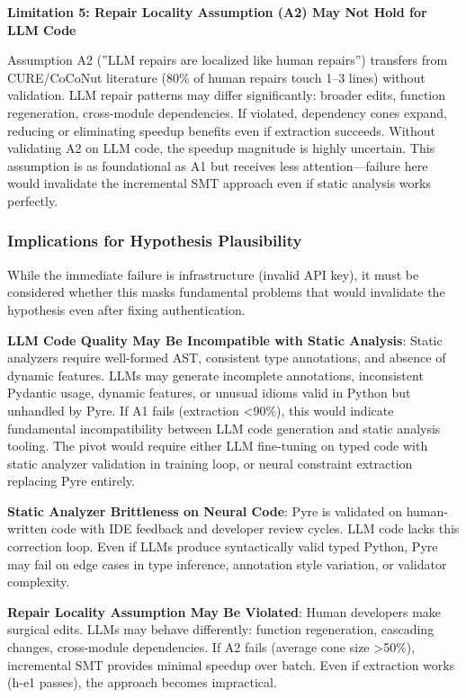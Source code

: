 \textbf{Limitation 5: Repair Locality Assumption (A2) May Not Hold for LLM Code}

Assumption A2 (''LLM repairs are localized like human repairs'') transfers from CURE/CoCoNut literature (80\% of human repairs touch 1--3 lines) without validation. LLM repair patterns may differ significantly: broader edits, function regeneration, cross-module dependencies. If violated, dependency cones expand, reducing or eliminating speedup benefits even if extraction succeeds. Without validating A2 on LLM code, the speedup magnitude is highly uncertain. This assumption is as foundational as A1 but receives less attention---failure here would invalidate the incremental SMT approach even if static analysis works perfectly.

\subsubsection{Implications for Hypothesis Plausibility}

While the immediate failure is infrastructure (invalid API key), it must be considered whether this masks fundamental problems that would invalidate the hypothesis even after fixing authentication.

\textbf{LLM Code Quality May Be Incompatible with Static Analysis}: Static analyzers require well-formed AST, consistent type annotations, and absence of dynamic features. LLMs may generate incomplete annotations, inconsistent Pydantic usage, dynamic features, or unusual idioms valid in Python but unhandled by Pyre. If A1 fails (extraction <90\%), this would indicate fundamental incompatibility between LLM code generation and static analysis tooling. The pivot would require either LLM fine-tuning on typed code with static analyzer validation in training loop, or neural constraint extraction replacing Pyre entirely.

\textbf{Static Analyzer Brittleness on Neural Code}: Pyre is validated on human-written code with IDE feedback and developer review cycles. LLM code lacks this correction loop. Even if LLMs produce syntactically valid typed Python, Pyre may fail on edge cases in type inference, annotation style variation, or validator complexity.

\textbf{Repair Locality Assumption May Be Violated}: Human developers make surgical edits. LLMs may behave differently: function regeneration, cascading changes, cross-module dependencies. If A2 fails (average cone size >50\%), incremental SMT provides minimal speedup over batch. Even if extraction works (h-e1 passes), the approach becomes impractical.

